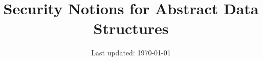 \documentclass{llncs}[11pt]
\title{{\bf Security Notions for Abstract Data Structures}}
\date{}
\author{Last updated: \today}
\begin{document}
\maketitle


\begin{abstract}
\centering
%
\end{abstract}




%

\appendix








%
%



\end{document}
